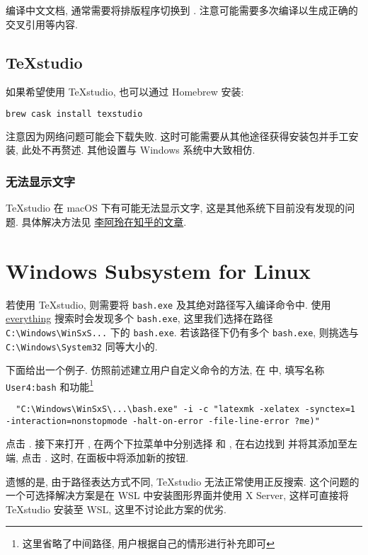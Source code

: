 编译中文文档, 通常需要将排版程序切换到 .
注意可能需要多次编译以生成正确的交叉引用等内容.

\subsection{\TeX studio}

如果希望使用 \TeX studio, 也可以通过 Homebrew 安装:
\begin{lstlisting}[language=bash]
  brew cask install texstudio
\end{lstlisting}
注意因为网络问题可能会下载失败.
这时可能需要从其他途径获得安装包并手工安装, 此处不再赘述.
其他设置与 Windows 系统中大致相仿.

\subsubsection{无法显示文字}

\TeX studio 在 macOS 下有可能无法显示文字,
这是其他系统下目前没有发现的问题.
具体解决方法见%
\href{https://zhuanlan.zhihu.com/p/80728204}{李阿玲在知乎的文章}.

\section{Windows Subsystem for Linux}

若使用 \TeX studio,
则需要将 \texttt{bash.exe} 及其绝对路径写入编译命令中.
使用
\href{https://www.voidtools.com/zh-cn/}{everything}
搜索时会发现多个 \texttt{bash.exe},
这里我们选择在路径
\texttt{C:\textbackslash Windows\textbackslash WinSxS...}
下的 \texttt{bash.exe}.
若该路径下仍有多个 \texttt{bash.exe},
则挑选与
\texttt{C:\textbackslash Windows\textbackslash System32}
同等大小的.

下面给出一个例子.
仿照前述建立用户自定义命令的方法,
在
中,
填写名称
\texttt{User4:bash}
和功能\footnote{这里省略了中间路径, 用户根据自己的情形进行补充即可}
\begin{lstlisting}
  "C:\Windows\WinSxS\...\bash.exe" -i -c "latexmk -xelatex -synctex=1 -interaction=nonstopmode -halt-on-error -file-line-error ?me)"
\end{lstlisting}
点击 . 
接下来打开 ,
在两个下拉菜单中分别选择  和 ,
在右边找到  并将其添加至左端, 点击 . 
这时, 在面板中将添加新的按钮. 

遗憾的是, 由于路径表达方式不同, \TeX studio 无法正常使用正反搜索.
这个问题的一个可选择解决方案是在 WSL 中安装图形界面并使用 X Server,
这样可直接将 \TeX studio 安装至 WSL,
这里不讨论此方案的优劣.

